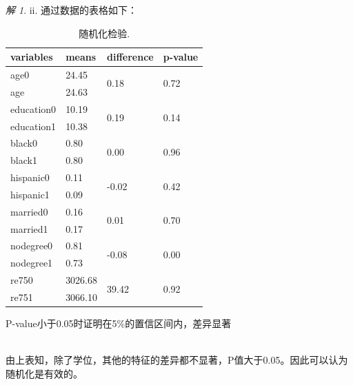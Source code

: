 \documentclass[a4paper]{ctexart}
\theoremstyle{remark}
\newtheorem*{solution}{解}
\begin{document}
\begin{itemize}
\begin{solution}
    ii. 通过数据的表格如下：\\
    \begin{table}[h]
        \centering
        \begin{threeparttable}%
            \begin{tabular}{llll}%
                \hline
                variables & means & difference & p-value \\   
                \hline
                age0 & 24.45 & \multirow{2}{*}{0.18}  & \multirow{2}{*}{0.72} \\
                age & 24.63 &   &\\
                education0 & 10.19 & \multirow{2}{*}{0.19} & \multirow{2}{*}{0.14}\\
                education1 & 10.38 &  & \\
                black0 & 0.80 & \multirow{2}{*}{0.00} & \multirow{2}{*}{0.96} \\
                black1 & 0.80 &  &  \\
                hispanic0 & 0.11 & \multirow{2}{*}{-0.02} & \multirow{2}{*}{0.42} \\
                hispanic1 & 0.09 &  &  \\
                married0 & 0.16 & \multirow{2}{*}{0.01} & \multirow{2}{*}{0.70} \\ 
                married1 & 0.17 &  &  \\    
                nodegree0 & 0.81 & \multirow{2}{*}{-0.08} & \multirow{2}{*}{0.00} \\
                nodegree1 & 0.73 &  &  \\
                re750 & 3026.68 & \multirow{2}{*}{39.42} & \multirow{2}{*}{0.92} \\
                re751 & 3066.10 &  &   \\
                \hline
            \end{tabular} 
            \begin{tablenotes}
                \footnotesize
                    \item[1]P-value小于0.05时证明在5\%的置信区间内，差异显著
            \end{tablenotes}
        \end{threeparttable}
        \caption{\label{font-table} 随机化检验. }
    \end{table}\\
    由上表知，除了学位，其他的特征的差异都不显著，P值大于0.05。因此可以认为随机化是有效的。\\
\\
\\
\\


\end{solution}
\end{itemize}
\end{document}
